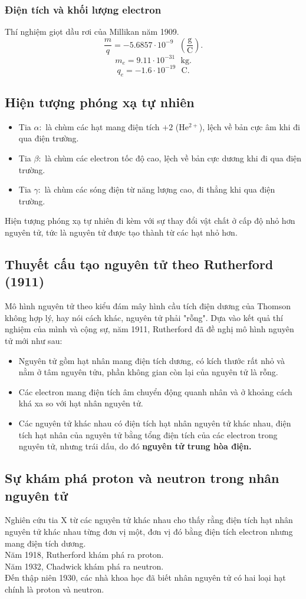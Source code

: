 \subsubsection{Điện tích và khối lượng electron}
Thí nghiệm giọt dầu rơi của Millikan năm 1909.\\
$$\frac{m}{q} = -5.6857 \cdot 10^{-9} \text{ } \left( {\mathrm{\frac{g}{C}}} \right).$$
$$m_e = 9.11 \cdot 10^{-31} \text{ } \mathrm{kg}.$$
$$q_e = -1.6 \cdot 10^{-19} \text{ } \mathrm{C}.$$
\subsection{Hiện tượng phóng xạ tự nhiên}
\begin{itemize}
\item Tia $\alpha:$ là chùm các hạt mang điện tích $+2$ ($\mathrm{He^{2+}}$), lệch về bản cực âm khi đi qua điện trường.
\item Tia $\beta:$ là chùm các electron tốc độ cao, lệch về bản cực dương khi đi qua điện trường.
\item Tia $\gamma:$ là chùm các sóng điện từ năng lượng cao, đi thẳng khi qua điện trường.
\end{itemize}
Hiện tượng phóng xạ tự nhiên đi kèm với sự thay đổi vật chất ở cấp độ nhỏ hơn nguyên tử, tức là nguyên tử được tạo thành từ các hạt nhỏ hơn.
\subsection{Thuyết cấu tạo nguyên tử theo Rutherford (1911)}
Mô hình nguyên tử theo kiểu đám mây hình cầu tích điện dương của Thomson không hợp lý, hay nói cách khác, nguyên tử phải "rỗng". Dựa vào kết quả thí nghiệm của mình và cộng sự, năm 1911, Rutherford đã đề nghị mô hình nguyên tử mới như sau:
\begin{itemize}
\item Nguyên tử gồm hạt nhân mang điện tích dương, có kích thước rất nhỏ và nằm ở tâm nguyên tửu, phần không gian còn lại của nguyên tử là rỗng.
\item Các electron mang điện tích âm chuyển động quanh nhân và ở khoảng cách khá xa so với hạt nhân nguyên tử.
\item Các nguyên tử khác nhau có điện tích hạt nhân nguyên tử khác nhau, điện tích hạt nhân của nguyên tử bằng tổng điện tích của các electron trong nguyên tử, nhưng trái dấu, do đó \textbf{nguyên tử trung hòa điện.}
\end{itemize}
\subsection{Sự khám phá proton và neutron trong nhân nguyên tử}
Nghiên cứu tia X từ các nguyên tử khác nhau cho thấy rằng điện tích hạt nhân nguyên tử khác nhau từng đơn vị một, đơn vị đó bằng điện tích electron nhưng mang điện tích dương.\\
Năm 1918, Rutherford khám phá ra proton.\\
Năm 1932, Chadwick khám phá ra neutron.\\
Đến thập niên 1930, các nhà khoa học đã biết nhân nguyên tử có hai loại hạt chính là proton và neutron.
